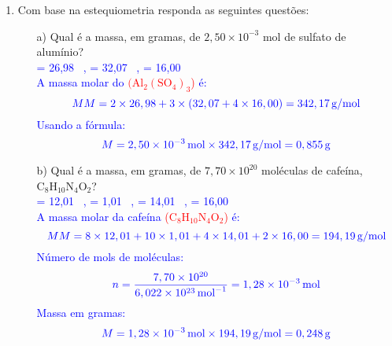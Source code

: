 \documentclass[a4paper, 12pt]{article}
\begin{document}
\begin{enumerate}
    \item Com base na estequiometria responda as seguintes questões:
          \begin{enumerate}[align=left, labelsep=-0.5em]
              \item[a)] Qual é a massa, em gramas, de \(2,50 \times 10^{-3}\) mol de sulfato de alumínio?
                    \\[10pt]
                    \textcolor{blue}{\textcolor{red}{} = 26,98 \, , \quad \textcolor{red}{} = 32,07 \, , \quad \textcolor{red}{} = 16,00 \, }
                    \\[10pt]
                    \textcolor{blue}{A massa molar do \textcolor{red}{\((\text{Al}_2(\text{SO}_4)_3\))} é:}
                    \[
                        \textcolor{blue}{\text{$MM$} = 2 \times 26,98 + 3 \times (32,07 + 4 \times 16,00) = 342,17 \, \text{g/mol}}
                    \]
                    \textcolor{blue}{Usando a fórmula:}
                    \[
                        \textcolor{blue}{\text{$M$} = 2,50 \times 10^{-3} \, \text{mol} \times 342,17 \, \text{g/mol} = 0,855 \, \text{g}}
                    \]
              \item[b)] Qual é a massa, em gramas, de \(7,70 \times 10^{20}\) moléculas de cafeína, \(\text{C}_{8}\text{H}_{10}\text{N}_{4}\text{O}_{2}\)?
                    \\[10pt]
                    \textcolor{blue}{\textcolor{red}{} = 12,01 \, , \quad \textcolor{red}{} = 1,01 \, , \quad \textcolor{red}{} = 14,01 \, , \quad \textcolor{red}{} = 16,00 \, }
                    \\[10pt]
                    \textcolor{blue}{A massa molar da cafeína \textcolor{red}{(\(\text{C}_{8}\text{H}_{10}\text{N}_{4}\text{O}_{2}\))} é:}
                    \[
                        \textcolor{blue}{\text{$MM$} = 8 \times 12,01 + 10 \times 1,01 + 4 \times 14,01 + 2 \times 16,00 = 194,19 \, \text{g/mol}}
                    \]
                    \textcolor{blue}{Número de mols de moléculas:}
                    \[
                        \textcolor{blue}{\text{$n$} = \frac{7,70 \times 10^{20}}{6,022 \times 10^{23} \, \text{mol}^{-1}} = 1,28 \times 10^{-3} \, \text{mol}}
                    \]
                    \textcolor{blue}{Massa em gramas:}
                    \[
                        \textcolor{blue}{\text{$M$} = 1,28 \times 10^{-3} \, \text{mol} \times 194,19 \, \text{g/mol} = 0,248 \, \text{g}}
\]
\end{enumerate}
\end{enumerate}
\end{document}
